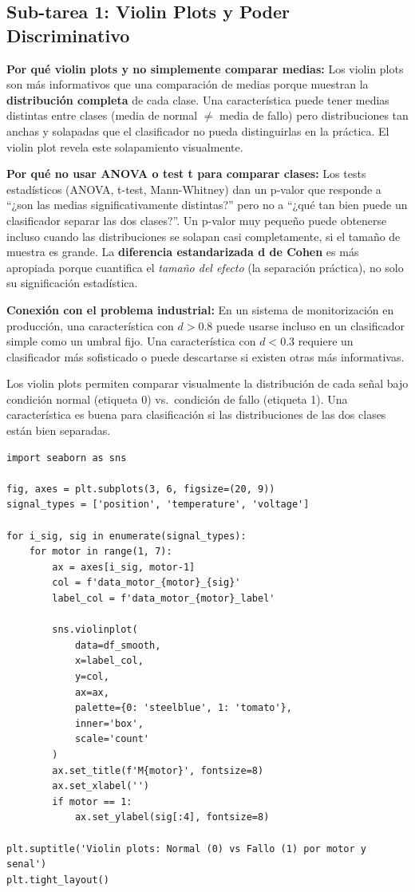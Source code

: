 \documentclass[12pt,a4paper]{article}
\begin{document}
\subsection{Sub-tarea 1: Violin Plots y Poder Discriminativo}

\begin{whybox}
\textbf{Por qué violin plots y no simplemente comparar medias:}
Los violin plots son más informativos que una comparación de medias porque muestran
la \textbf{distribución completa} de cada clase. Una característica puede tener
medias distintas entre clases (media de normal $\neq$ media de fallo) pero distribuciones
tan anchas y solapadas que el clasificador no pueda distinguirlas en la práctica.
El violin plot revela este solapamiento visualmente.

\textbf{Por qué no usar ANOVA o test t para comparar clases:}
Los tests estadísticos (ANOVA, t-test, Mann-Whitney) dan un p-valor que responde
a ``¿son las medias significativamente distintas?'' pero no a ``¿qué tan bien puede
un clasificador separar las dos clases?''. Un p-valor muy pequeño puede obtenerse
incluso cuando las distribuciones se solapan casi completamente, si el tamaño de
muestra es grande. La \textbf{diferencia estandarizada d de Cohen} es más apropiada
porque cuantifica el \emph{tamaño del efecto} (la separación práctica), no solo su
significación estadística.

\textbf{Conexión con el problema industrial:}
En un sistema de monitorización en producción, una característica con $d > 0.8$
puede usarse incluso en un clasificador simple como un umbral fijo. Una característica
con $d < 0.3$ requiere un clasificador más sofisticado o puede descartarse si existen
otras más informativas.
\end{whybox}

Los violin plots permiten comparar visualmente la distribución de cada señal
bajo condición normal (etiqueta 0) vs.\ condición de fallo (etiqueta 1).
Una característica es buena para clasificación si las distribuciones de las dos
clases están bien separadas.

\begin{lstlisting}[caption={Violin plots por señal y motor}, label={lst:violin}]
import seaborn as sns

fig, axes = plt.subplots(3, 6, figsize=(20, 9))
signal_types = ['position', 'temperature', 'voltage']

for i_sig, sig in enumerate(signal_types):
    for motor in range(1, 7):
        ax = axes[i_sig, motor-1]
        col = f'data_motor_{motor}_{sig}'
        label_col = f'data_motor_{motor}_label'

        sns.violinplot(
            data=df_smooth,
            x=label_col,
            y=col,
            ax=ax,
            palette={0: 'steelblue', 1: 'tomato'},
            inner='box',
            scale='count'
        )
        ax.set_title(f'M{motor}', fontsize=8)
        ax.set_xlabel('')
        if motor == 1:
            ax.set_ylabel(sig[:4], fontsize=8)

plt.suptitle('Violin plots: Normal (0) vs Fallo (1) por motor y senal')
plt.tight_layout()
\end{lstlisting}
\end{document}
